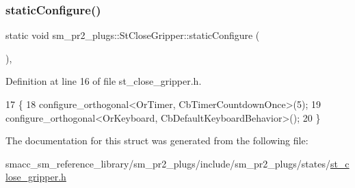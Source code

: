 \subsubsection{\texorpdfstring{static\+Configure()}{staticConfigure()}}
{\footnotesize\ttfamily static void sm\+\_\+pr2\+\_\+plugs\+::\+St\+Close\+Gripper\+::static\+Configure (\begin{DoxyParamCaption}{ }\end{DoxyParamCaption})\hspace{0.3cm}{\ttfamily [inline]}, {\ttfamily [static]}}



Definition at line 16 of file st\+\_\+close\+\_\+gripper.\+h.


\begin{DoxyCode}
17     \{
18         configure\_orthogonal<OrTimer,  CbTimerCountdownOnce>(5);    
19         configure\_orthogonal<OrKeyboard, CbDefaultKeyboardBehavior>();
20     \}
\end{DoxyCode}


The documentation for this struct was generated from the following file\+:\begin{DoxyCompactItemize}
\item 
smacc\+\_\+sm\+\_\+reference\+\_\+library/sm\+\_\+pr2\+\_\+plugs/include/sm\+\_\+pr2\+\_\+plugs/states/\hyperlink{sm__pr2__plugs_2include_2sm__pr2__plugs_2states_2st__close__gripper_8h}{st\+\_\+close\+\_\+gripper.\+h}\end{DoxyCompactItemize}
